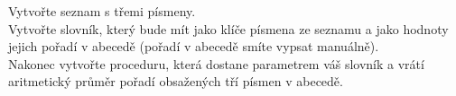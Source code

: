 \question[70]
Vytvořte seznam s třemi písmeny.\\
Vytvořte slovník, který bude mít jako klíče písmena ze seznamu a jako hodnoty
jejich pořadí v abecedě (pořadí v abecedě smíte vypsat manuálně).\\
Nakonec vytvořte proceduru, která dostane parametrem váš slovník a vrátí
aritmetický průměr pořadí obsažených tří písmen v abecedě.